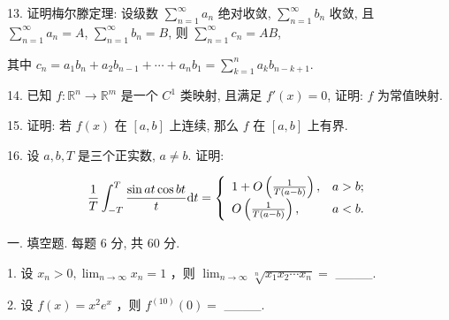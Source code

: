 \documentclass{examcollection}
\renewcommand{\displayformula}[1]{\[#1\]}
\begin{document}
{\begin{minipage}{\textwidth}
13. 证明梅尔滕定理: 设级数 $\sum_{n=1}^{\infty} a_n$ 绝对收敛, $\sum_{n=1}^{\infty} b_n$ 收敛, 且 $\sum_{n=1}^{\infty} a_n = A$, $\sum_{n=1}^{\infty} b_n = B$, 则 $\sum_{n=1}^{\infty} c_n = AB$,\par
其中  $c_{n}=a_{1}b_{n}+a_{2}b_{n-1}+\cdots+a_{n}b_{1}=\sum_{k=1}^{n}a_{k}b_{n-k+1}.$\par
14. 已知 $f: \mathbb{R}^n \to \mathbb{R}^m$ 是一个 $C^1$ 类映射, 且满足 $f'(x) = 0$, 证明: $f$ 为常值映射.\par
15. 证明: 若 $f(x)$ 在 $[a, b]$ 上连续, 那么 $f$ 在 $[a, b]$ 上有界.\par
16. 设 $a, b, T$ 是三个正实数, $a \neq b$. 证明:\par
\displayformula{\frac {1}{T} \int_ {- T} ^ {T} \frac {\sin a t \cos b t}{t}   \mathrm{d} t = \left\{ \begin{array}{l l} 1 + O \left(\frac {1}{T (a - b)}\right), & a > b; \\ O \left(\frac {1}{T (a - b)}\right), & a <   b. \end{array} \right.}\par
{}\smallskip
一. 填空题. 每题 6 分, 共 60 分.\par
1. 设  $x_{n}>0,\lim_{n\to\infty}x_{n}=1$ ，则  $\lim_{n\to\infty}\sqrt[n]{x_{1}x_{2}\cdots x_{n}}=$  \_\_\_\_.\par
2. 设  $f(x)=x^{2}e^{x}$ ，则  $f^{(10)}(0)=$  \_\_\_\_.\par
\end{minipage}}
\ifdim\dimexpr\ht\proofbox+\dp\proofbox\relax>\textheight
\noindent\resizebox{!}{\textheight}{\usebox{\proofbox}}\else\noindent\usebox{\proofbox}\fi\clearpage
\end{document}

